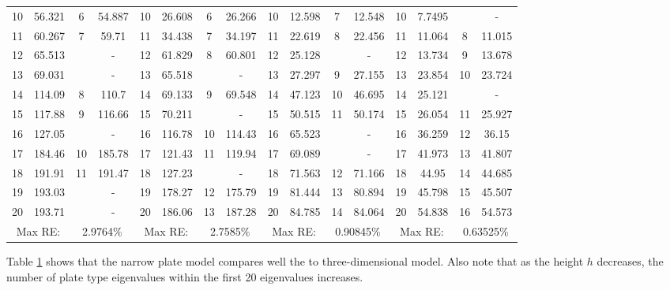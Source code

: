 \documentclass[../../main.tex]{subfiles}
\begin{document}
\begin{table}[htbp]
{{\begin{tabular}{|cccc||cccc||cccc||cccc|}
			10    & 56.321 & 6     & {54.887} & 10    & 26.608 & 6     & 26.266 & 10    & 12.598 & 7     & 12.548 & 10    & 7.7495 &       & {-} \\
			11    & 60.267 & 7     & {59.71} & 11    & 34.438 & 7     & 34.197 & 11    & 22.619 & 8     & 22.456 & 11    & 11.064 & 8     & 11.015 \\
			12    & 65.513 &       & -     & 12    & 61.829 & 8     & 60.801 & 12    & 25.128 &       & {-} & 12    & 13.734 & 9     & 13.678 \\
			13    & 69.031 &       & -     & 13    & 65.518 &       & {-} & 13    & 27.297 & 9     & 27.155 & 13    & 23.854 & 10    & 23.724 \\
			14    & 114.09 & 8     & {110.7} & 14    & 69.133 & 9     & 69.548 & 14    & 47.123 & 10    & 46.695 & 14    & 25.121 &       & {-} \\
			15    & 117.88 & 9     & {116.66} & 15    & 70.211 &       & {-} & 15    & 50.515 & 11    & 50.174 & 15    & 26.054 & 11    & 25.927 \\
			16    & 127.05 &       & -     & 16    & 116.78 & 10    & 114.43 & 16    & 65.523 &       & {-} & 16    & 36.259 & 12    & 36.15 \\
			17    & 184.46 & 10    & {185.78} & 17    & 121.43 & 11    & 119.94 & 17    & 69.089 &       & {-} & 17    & 41.973 & 13    & 41.807 \\
			18    & 191.91 & 11    & {191.47} & 18    & 127.23 &       & {-} & 18    & 71.563 & 12    & 71.166 & 18    & 44.95 & 14    & 44.685 \\
			19    & 193.03 &       & -     & 19    & 178.27 & 12    & 175.79 & 19    & 81.444 & 13    & 80.894 & 19    & 45.798 & 15    & 45.507 \\
			20    & 193.71 &       & -     & 20    & 186.06 & 13    & 187.28 & 20    & 84.785 & 14    & 84.064 & 20    & 54.838 & 16    & 54.573 \\
			\hline
			\multicolumn{2}{|c}{Max RE:} & \multicolumn{2}{c||}{2.9764\%} & \multicolumn{2}{c}{Max RE:} & \multicolumn{2}{c||}{2.7585\%} & \multicolumn{2}{c}{Max RE:} & \multicolumn{2}{c||}{0.90845\%} & \multicolumn{2}{c}{Max RE:} & \multicolumn{2}{c|}{0.63525\%} \\
			\hline
		\end{tabular}%
		\label{tab:Table_plate_1}%
	}}
\end{table}%
\FloatBarrier

Table \ref{tab:Table_plate_1} shows that the narrow plate model compares well the to three-dimensional model. Also note that as the height $h$ decreases, the number of plate type eigenvalues within the first 20 eigenvalues increases. 
\end{document}
